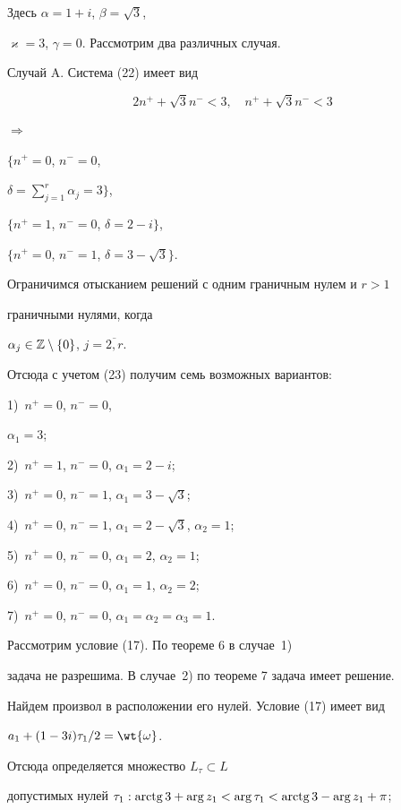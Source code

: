 Здесь $\alpha=1+i$, $\beta=\sqrt{3}$,


$\varkappa =3$, $\gamma=0$. Рассмотрим два различных случая.





Случай A.  Система (22) имеет вид


$$


2n^{+}+ \sqrt {3}n^{-} < 3,\quad n^+ + \sqrt {3} n^- < 3


$$


$\Longrightarrow$


$\Big\{n^+=0$, $n^-=0$,


$\delta = \sum\limits_{j=1}^{r}\alpha_{j}=3 \Big\}$,


$\{n^+=1$, $n^- = 0$, $\delta = 2-i \}$,


$\{n^{+}=0$, $n^{-}=1$, $\delta =3-\sqrt{3}\}$.


Ограничимся отысканием решений с одним граничным нулем и $r>1$


граничными нулями, когда


$\alpha_{j}\in\Bbb Z\setminus\{0\}$, $j=\overline{2,r}$.


Отсюда с учетом (23) получим семь возможных вариантов:


1)~$n^+=0$, $n^-=0$,


$\alpha_{1}=3$;


2)~$n^+=1$, $n^- = 0$, $\alpha_1 = 2-i$;


3)~$n^{+}=0$, $n^{-}=1$, $\alpha_1 =3-\sqrt{3}$;


4)~$n^+ =0$, $n^-=1$, $\alpha_1 =2-\sqrt{3}$, $\alpha_2 = 1$;


5)~$n^+ =0$, $n^- = 0$, $\alpha_1 =2$, $\alpha_2 = 1$;


6)~$n^+=0$, $n^-=0$, $\alpha_1 = 1$, $\alpha_2 = 2$;


7)~$n^+ =0$, $n^- =0$, $\alpha_1 =\alpha_2=\alpha_3 =1$.


Рассмотрим условие (17). По теореме 6 в случае~1)


задача не разрешима. В случае~2) по теореме 7 задача имеет решение.


Найдем произвол в расположении его нулей. Условие (17) имеет вид


$a_1 + (1-3i)\tau_1/2=\wt{\omega}$.


Отсюда определяется множество $L_{\tau}\subset L$


допустимых нулей $\tau_1:\arctg 3 +\arg z_1 < \arg \tau_1 <


\arctg 3 - \arg z_1 +\pi$;


